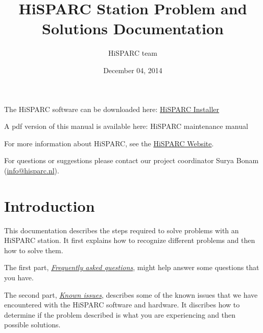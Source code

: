 \documentclass[a4paper,11pt,english]{sphinxmanual}
\title{HiSPARC Station Problem and Solutions Documentation}
\date{December 04, 2014}
\author{HiSPARC team}
\begin{document}
\maketitle
\tableofcontents
{}\label{index::doc}


The HiSPARC software can be downloaded here: \href{http://www.hisparc.nl/downloads/software/}{HiSPARC Installer}

A pdf version of this manual is available here: HiSPARC maintenance manual

For more information about HiSPARC, see the \href{http://www.hisparc.nl/}{HiSPARC Website}.

For questions or suggestions please contact our project coordinator
Surya Bonam (\href{mailto:info@hisparc.nl}{info@hisparc.nl}).


\chapter{Introduction}
\label{introduction:introduction}\label{introduction::doc}\label{introduction:welcome-to-the-hisparc-maintenance-documentation}
This documentation describes the steps required to solve problems with an HiSPARC station.  It first explains how to recognize different problems and then how to solve them.

The first part, {\hyperref[faq::doc]{\emph{Frequently asked questions}}}, might help answer some questions that you have.

The second part, {\hyperref[known-issues::doc]{\emph{Known issues}}}, describes some of the known issues that we have encountered with the HiSPARC software and hardware. It discribes how to determine if the problem described is what you are experiencing and then possible solutions.
\end{document}
